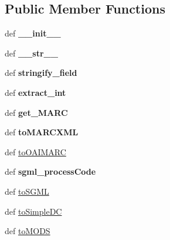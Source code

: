 \subsection*{Public Member Functions}
\begin{DoxyCompactItemize}
\item 
\hypertarget{classcheshire3_1_1marc__utils_1_1_m_a_r_c_ae3e2489fc0b181598678243565802a01}{def {\bfseries \-\_\-\-\_\-init\-\_\-\-\_\-}}\label{classcheshire3_1_1marc__utils_1_1_m_a_r_c_ae3e2489fc0b181598678243565802a01}

\item 
\hypertarget{classcheshire3_1_1marc__utils_1_1_m_a_r_c_a162cf6631d5df10c955b438578f1e7d8}{def {\bfseries \-\_\-\-\_\-str\-\_\-\-\_\-}}\label{classcheshire3_1_1marc__utils_1_1_m_a_r_c_a162cf6631d5df10c955b438578f1e7d8}

\item 
\hypertarget{classcheshire3_1_1marc__utils_1_1_m_a_r_c_a4b7f071f36fa145e4288774a57972b8f}{def {\bfseries stringify\-\_\-field}}\label{classcheshire3_1_1marc__utils_1_1_m_a_r_c_a4b7f071f36fa145e4288774a57972b8f}

\item 
\hypertarget{classcheshire3_1_1marc__utils_1_1_m_a_r_c_af4a7724a4ad577452bcfff2f87517740}{def {\bfseries extract\-\_\-int}}\label{classcheshire3_1_1marc__utils_1_1_m_a_r_c_af4a7724a4ad577452bcfff2f87517740}

\item 
\hypertarget{classcheshire3_1_1marc__utils_1_1_m_a_r_c_ac282946443b388493fd6a21054e99f5a}{def {\bfseries get\-\_\-\-M\-A\-R\-C}}\label{classcheshire3_1_1marc__utils_1_1_m_a_r_c_ac282946443b388493fd6a21054e99f5a}

\item 
\hypertarget{classcheshire3_1_1marc__utils_1_1_m_a_r_c_aeeb210effcbfd7042c96bf18783540eb}{def {\bfseries to\-M\-A\-R\-C\-X\-M\-L}}\label{classcheshire3_1_1marc__utils_1_1_m_a_r_c_aeeb210effcbfd7042c96bf18783540eb}

\item 
def \hyperlink{classcheshire3_1_1marc__utils_1_1_m_a_r_c_a558837901617a82b316a0d0ddb8b3da9}{to\-O\-A\-I\-M\-A\-R\-C}
\item 
\hypertarget{classcheshire3_1_1marc__utils_1_1_m_a_r_c_a45ef03b912af8e702947e2c97ff1e744}{def {\bfseries sgml\-\_\-process\-Code}}\label{classcheshire3_1_1marc__utils_1_1_m_a_r_c_a45ef03b912af8e702947e2c97ff1e744}

\item 
def \hyperlink{classcheshire3_1_1marc__utils_1_1_m_a_r_c_af0b18c47242a60a3b657c50dbeaac893}{to\-S\-G\-M\-L}
\item 
def \hyperlink{classcheshire3_1_1marc__utils_1_1_m_a_r_c_a363c8fd51359a4cc31636ddfb4be709c}{to\-Simple\-D\-C}
\item 
def \hyperlink{classcheshire3_1_1marc__utils_1_1_m_a_r_c_a7c3bdc4b4e505a4e44d980322faba95f}{to\-M\-O\-D\-S}
\end{DoxyCompactItemize}
